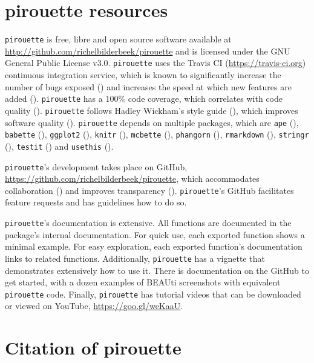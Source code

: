\documentclass{article}
\begin{document}
\section{pirouette resources}

\verb;pirouette; is free, libre and open source software available at 
\url{http://github.com/richelbilderbeek/pirouette}
and is licensed under the GNU General Public License v3.0.
\verb;pirouette; uses the Travis CI (\url{https://travis-ci.org})
continuous integration service, which is known to significantly 
increase the number of bugs exposed (\cite{vasilescu2015}) and increases
the speed at which new features are added (\cite{vasilescu2015}).
\verb;pirouette; has a 100\% code coverage, which correlates with 
code quality (\cite{horgan1994,del1995correlation}). 
\verb;pirouette; follows Hadley Wickham's style guide (\cite{style_guide}), 
which improves software quality (\cite{fang2001}).
\verb;pirouette; depends on multiple packages, which are 
\verb;ape; (\cite{APE}), 
\verb;babette; (\cite{bilderbeek2018babette}),
\verb;ggplot2; (\cite{ggplot2}),
\verb;knitr; (\cite{knitr}),
\verb;mcbette; (\cite{mcbette}),
\verb;phangorn; (\cite{phangorn}),
\verb;rmarkdown; (\cite{rmarkdown}),
\verb;stringr; (\cite{stringr}),
\verb;testit; (\cite{testit}) and 
\verb;usethis; (\cite{usethis}).

\verb;pirouette;'s development takes place on GitHub,
\url{https://github.com/richelbilderbeek/pirouette}, 
which accommodates collaboration (\cite{perez2016ten}) 
and improves transparency (\cite{gorgolewski2016practical}).
\verb;pirouette;'s GitHub facilitates feature requests and 
has guidelines how to do so.

\verb;pirouette;'s documentation is extensive. All functions are documented
in the package's internal documentation. For quick use, 
each exported function shows a minimal example. 
For easy exploration, each exported function's documentation links to related functions.
Additionally, \verb;pirouette; has a vignette that demonstrates extensively how
to use it. There is documentation on the GitHub to get started, 
with a dozen examples of BEAUti screenshots with equivalent \verb;pirouette; code.
Finally, \verb;pirouette; has tutorial videos that can 
be downloaded or viewed on YouTube, \url{https://goo.gl/weKaaU}.

\section{Citation of pirouette}
\end{document}

